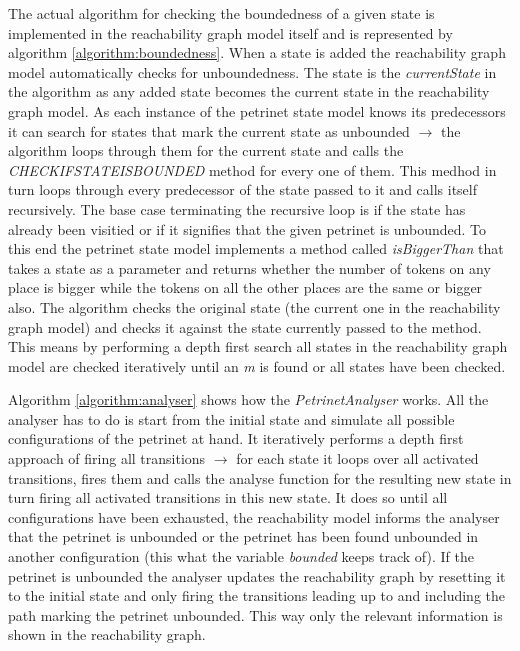 \documentclass[10pt, a4paper]{article}
\begin{document}
The actual algorithm for checking the boundedness of a given state is implemented in the reachability graph model itself and is represented by algorithm \ref{algorithm:boundedness}. When a state is added the reachability graph model automatically checks for unboundedness. The state is the \textit{currentState} in the algorithm as any added state becomes the current state in the reachability graph model. As each instance of the petrinet state model knows its predecessors it can search for states that mark the current state as unbounded $\rightarrow$ the algorithm loops through them for the current state and calls the \textit{CHECKIFSTATEISBOUNDED} method for every one of them. This medhod in turn loops through every predecessor of the state passed to it and calls itself recursively. The base case terminating the recursive loop is if the state has already been visitied or if it signifies that the given petrinet is unbounded. To this end the petrinet state model implements a method called \textit{isBiggerThan} that takes a state as a parameter and returns whether the number of tokens on any place is bigger while the tokens on all the other places are the same or bigger also. The algorithm checks the original state (the current one in the reachability graph model) and checks it against the state currently passed to the method. This means by performing a depth first search all states in the reachability graph model are checked iteratively until an \textit{m} is found or all states have been checked.




Algorithm \ref{algorithm:analyser} shows how the \textit{PetrinetAnalyser} works. All the analyser has to do is start from the initial state and simulate all possible configurations of the petrinet at hand. It iteratively performs a depth first approach of firing all transitions $\rightarrow$ for each state it loops over all activated transitions, fires them and calls the analyse function for the resulting new state in turn firing all activated transitions in this new state. It does so until all configurations have been exhausted, the reachability model informs the analyser that the petrinet is unbounded or the petrinet has been found unbounded in another configuration (this what the variable \textit{bounded} keeps track of). If the petrinet is unbounded the analyser updates the reachability graph by resetting it to the initial state and only firing the transitions leading up to and including the path marking the petrinet unbounded. This way only the relevant information is shown in the reachability graph.
\end{document}
